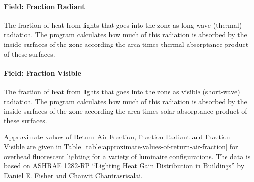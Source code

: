\paragraph{Field: Fraction Radiant}\label{field-fraction-radiant-1}

The fraction of heat from lights that goes into the zone as long-wave (thermal) radiation. The program calculates how much of this radiation is absorbed by the inside surfaces of the zone according the area times thermal absorptance product of these surfaces.

\paragraph{Field: Fraction Visible}\label{field-fraction-visible}

The fraction of heat from lights that goes into the zone as visible (short-wave) radiation. The program calculates how much of this radiation is absorbed by the inside surfaces of the zone according the area times solar absorptance product of these surfaces.

Approximate values of Return Air Fraction, Fraction Radiant and Fraction Visible are given in Table~\ref{table:approximate-values-of-return-air-fraction} for overhead fluorescent lighting for a variety of luminaire configurations. The data is based on ASHRAE 1282-RP ``Lighting Heat Gain Distribution in Buildings'' by Daniel E. Fisher and Chanvit Chantrasrisalai.

